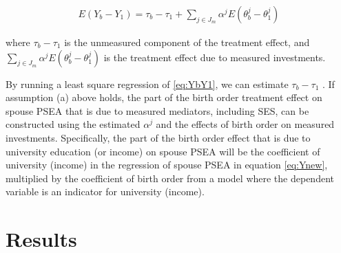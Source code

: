 \documentclass[
]{article}
\begin{document}
\begin{align}
\label{eq:YbY1}
E(Y_b - Y_1) = \tau_b - \tau_1 + \sum_{j \in J_m} \alpha^j E(\theta^j_b - \theta^j_1)
\end{align}

where \(\tau_b - \tau_1\) is the unmeasured component of the treatment
effect, and \(\sum_{j \in J_m} \alpha^j E(\theta^j_b - \theta^j_1)\) is
the treatment effect due to measured investments.

By running a least square regression of \eqref{eq:YbY1}, we can estimate
\(\tau_b - \tau_1\) . If assumption (a) above holds, the part of the birth
order treatment effect on spouse PSEA that is due to measured mediators,
including SES, can be constructed using the estimated \(\alpha^j\) and the
effects of birth order on measured investments. Specifically, the part
of the birth order effect that is due to university education (or
income) on spouse PSEA will be the coefficient of university (income) in
the regression of spouse PSEA in equation \eqref{eq:Ynew}, multiplied by
the coefficient of birth order from a model where the dependent variable
is an indicator for university (income).

\hypertarget{results}{%
\section{Results}\label{results}}

 
  \providecommand{\huxb}[2]{\arrayrulecolor[RGB]{#1}\global\arrayrulewidth=#2pt}
  \providecommand{\huxvb}[2]{\color[RGB]{#1}\vrule width #2pt}
  \providecommand{\huxtpad}[1]{\rule{0pt}{#1}}
  \providecommand{\huxbpad}[1]{\rule[-#1]{0pt}{#1}}
\end{document}
